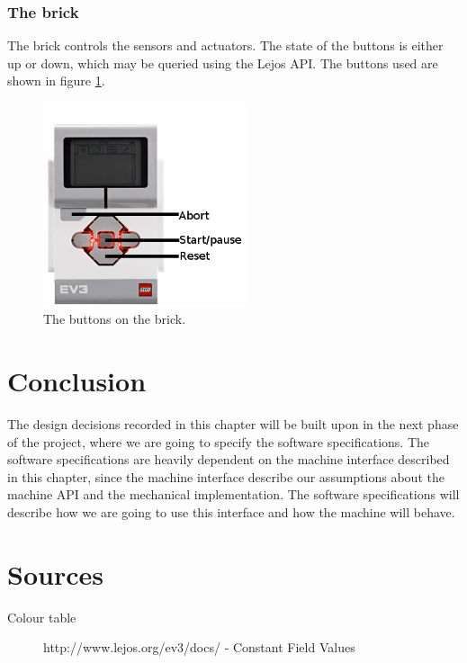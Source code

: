 \documentclass[a4paper,oneside,11pt]{article}
\begin{document}
\subsubsection{The brick}
The brick controls the sensors and actuators. The state of the buttons is either
up or down, which may be queried using the Lejos API. The buttons used are shown in figure \ref{brickbuttons}.
\begin{figure}[H]
	\centering
	\includegraphics[width=60mm]{BrickButtons}
	\caption{\label{brickbuttons}The buttons on the brick.}
\end{figure}

\section{Conclusion}
The design decisions recorded in this chapter will be built upon in the next phase of the
project, where we are going to specify the software specifications. The software specifications
are heavily dependent on the machine interface described in this chapter, since the machine
interface describe our assumptions about the machine API and the mechanical implementation.
The software specifications will describe how we are going to use this interface and how the
machine will behave.

\section{Sources}
\begin{description}
\item[Colour table]  http://www.lejos.org/ev3/docs/ - Constant Field Values
\end{description}
\end{document}
